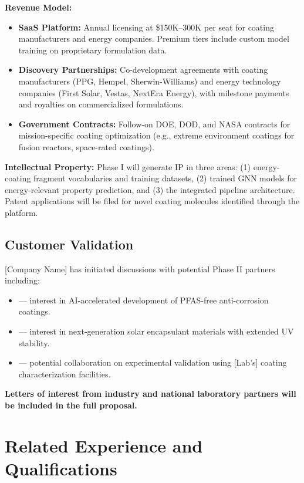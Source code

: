 \documentclass[11pt,letterpaper]{article}
\begin{document}
\textbf{Revenue Model:}
\begin{itemize}[noitemsep]
  \item \textbf{SaaS Platform:} Annual licensing at \$150K--300K per seat for coating manufacturers and energy companies. Premium tiers include custom model training on proprietary formulation data.
  \item \textbf{Discovery Partnerships:} Co-development agreements with coating manufacturers (PPG, Hempel, Sherwin-Williams) and energy technology companies (First Solar, Vestas, NextEra Energy), with milestone payments and royalties on commercialized formulations.
  \item \textbf{Government Contracts:} Follow-on DOE, DOD, and NASA contracts for mission-specific coating optimization (e.g., extreme environment coatings for fusion reactors, space-rated coatings).
\end{itemize}

\textbf{Intellectual Property:} Phase I will generate IP in three areas: (1) energy-coating fragment vocabularies and training datasets, (2) trained GNN models for energy-relevant property prediction, and (3) the integrated pipeline architecture. Patent applications will be filed for novel coating molecules identified through the platform.

\subsection{Customer Validation}

[Company Name] has initiated discussions with potential Phase II partners including:
\begin{itemize}[noitemsep]
  \item [Coating Manufacturer] --- interest in AI-accelerated development of PFAS-free anti-corrosion coatings.
  \item [Energy Company/Utility] --- interest in next-generation solar encapsulant materials with extended UV stability.
  \item [DOE National Laboratory] --- potential collaboration on experimental validation using [Lab's] coating characterization facilities.
\end{itemize}

\textbf{Letters of interest from industry and national laboratory partners will be included in the full proposal.}

\section{Related Experience and Qualifications}
\label{sec:team}
\end{document}
